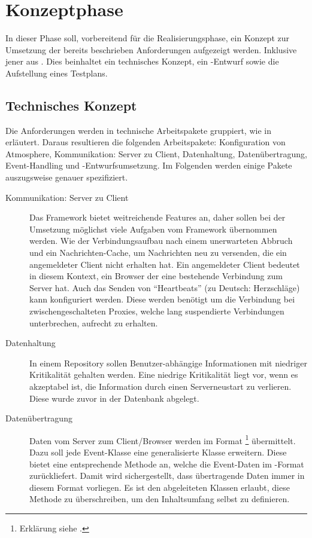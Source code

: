 \section{Konzeptphase}
\label{sec:Konzeptphase}
In dieser Phase soll, vorbereitend für die Realisierungsphase, ein Konzept zur Umsetzung der bereits beschrieben Anforderungen
aufgezeigt werden. Inklusive jener aus . Dies beinhaltet ein technisches Konzept,
ein -Entwurf sowie die Aufstellung eines Testplans.


\subsection{Technisches Konzept}
\label{sub:Technisches Konzept}
Die Anforderungen werden in technische Arbeitspakete gruppiert, wie in  erläutert. Daraus
resultieren die folgenden Arbeitspakete: Konfiguration von Atmosphere, Kommunikation: Server zu Client, Datenhaltung,
Datenübertragung, Event-Handling und -Entwurfsumsetzung. Im Folgenden werden einige Pakete auszugsweise genauer
spezifiziert.

\begin{description}
	\item [Kommunikation: Server zu Client]
Das Framework  bietet weitreichende Features an, daher sollen bei der Umsetzung möglichst viele Aufgaben
vom Framework übernommen werden. Wie \zB der Verbindungsaufbau nach einem unerwarteten Abbruch und ein Nachrichten-Cache, um
Nachrichten neu zu versenden, die ein angemeldeter Client nicht erhalten hat. Ein angemeldeter Client bedeutet in diesem Kontext,
ein Browser der eine bestehende Verbindung zum Server hat. Auch das Senden von \sog "`Heartbeats"' (zu Deutsch: Herzschläge) kann
konfiguriert werden. Diese werden benötigt um die Verbindung bei zwischengeschalteten Proxies, welche lang suspendierte
Verbindungen unterbrechen, aufrecht zu erhalten.
	\item [Datenhaltung]
In einem Repository  sollen Benutzer-abhängige Informationen mit niedriger Kritikalität
gehalten werden. Eine niedrige Kritikalität liegt vor, wenn es akzeptabel ist, die Information \zB durch einen Serverneustart zu
verlieren. Diese wurde zuvor in der Datenbank abgelegt.
	\item [Datenübertragung]
Daten vom Server zum Client/Browser werden im Format \footnote{Erklärung siehe \citep{JSON}.} übermittelt. Dazu
soll jede Event-Klasse eine generalisierte Klasse erweitern. Diese bietet eine entsprechende Methode an, welche die Event-Daten im
-Format zurückliefert. Damit wird sichergestellt, dass übertragende Daten immer in diesem Format vorliegen. Es ist den
abgeleiteten Klassen erlaubt, diese Methode zu überschreiben, um den Inhaltsumfang selbst zu definieren.
\end{description}


